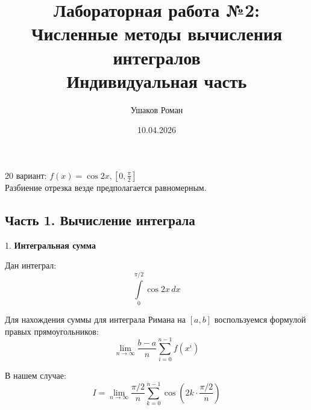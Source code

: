 \documentclass[12pt]{article}
\title{Лабораторная работа №2:\\ \large{Численные методы вычисления интегралов\\Индивидуальная часть}}
\author{Ушаков Роман}
\date{10.04.2026}
\begin{document}
\maketitle

20 вариант: \(f(x)=\cos{2x}, [0, \frac{\pi}{2}]\)
\vspace{0.2cm}\\
Разбиение отрезка везде предполагается равномерным.

\subsection*{Часть 1. Вычисление интеграла}

1. \textbf{Интегральная сумма}

Дан интеграл:
\[\int\limits_0^{\pi/2} \cos{2x} \, dx\]

Для нахождения суммы для интеграла Римана на \([a, b]\) воспользуемся формулой правых прямоугольников:
\[\lim\limits_{n\to\infty}\frac{b-a}{n}\sum^{n-1}_{i=0}{f(x^i)}\]

В нашем случае:
\[I=\lim\limits_{n\to\infty}\frac{\pi/2}{n}\sum^{n-1}_{k=0}{\cos{(2k \cdot \frac{\pi/2}{n})}}\]

\vspace{0.2cm}

\newpage
\end{document}
